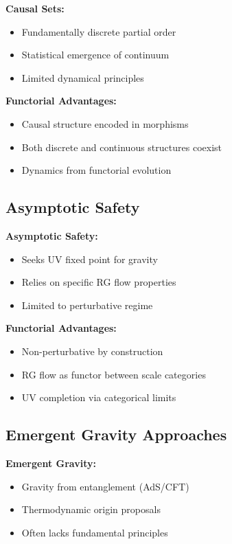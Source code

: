 \documentclass[11pt,a4paper]{article}
\begin{document}
\textbf{Causal Sets:}
\begin{itemize}
    \item Fundamentally discrete partial order
    \item Statistical emergence of continuum
    \item Limited dynamical principles
\end{itemize}

\textbf{Functorial Advantages:}
\begin{itemize}
    \item Causal structure encoded in morphisms
    \item Both discrete and continuous structures coexist
    \item Dynamics from functorial evolution
\end{itemize}

\subsection{Asymptotic Safety}

\textbf{Asymptotic Safety:}
\begin{itemize}
    \item Seeks UV fixed point for gravity
    \item Relies on specific RG flow properties
    \item Limited to perturbative regime
\end{itemize}

\textbf{Functorial Advantages:}
\begin{itemize}
    \item Non-perturbative by construction
    \item RG flow as functor between scale categories
    \item UV completion via categorical limits
\end{itemize}

\subsection{Emergent Gravity Approaches}

\textbf{Emergent Gravity:}
\begin{itemize}
    \item Gravity from entanglement (AdS/CFT)
    \item Thermodynamic origin proposals
    \item Often lacks fundamental principles
\end{itemize}
\end{document}
